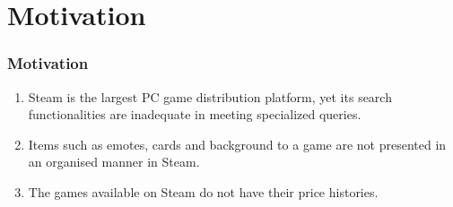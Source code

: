 \section{Motivation}
\begin{frame}
\frametitle{Motivation}

\begin{enumerate}[<+->]
	\setlength\itemsep{1em}
	\item Steam is the largest PC game distribution platform, yet its search functionalities are inadequate in meeting specialized queries.
	\item Items such as emotes, cards and background to a game are not presented in an organised manner in Steam.
	\item The games available on Steam do not have their price histories.

\end{enumerate}


\end{frame}

